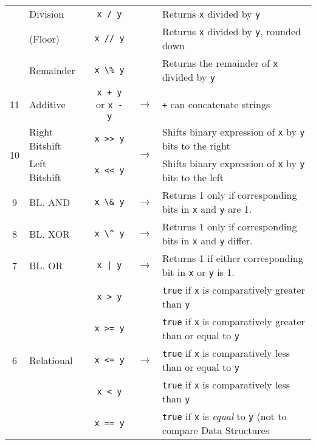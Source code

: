 \documentclass{article}
\begin{document}
\begin{center}
\begin{tabularx}{\textwidth}{clccX}
                      & Division & \lstinline|x / y| & & Returns \lstinline|x| divided by \lstinline|y|\\
                      & (Floor) & \lstinline|x // y| & & Returns \lstinline|x| divided by \lstinline|y|, rounded down\\
                      & Remainder & \lstinline|x \% y| & & Returns the remainder of \lstinline|x| divided by \lstinline|y|\\\midrule
                   11 & Additive & \lstinline|x + y| or \lstinline|x - y| & \(\to\) & \lstinline|+| can concatenate strings\\\midrule
  \multirow{2}{*}{10} & Right Bitshift & \lstinline|x >> y| & \multirow{2}{*}{\(\to\)} & Shifts binary expression of \lstinline|x| by \lstinline|y| bits to the right\\
                      & Left Bitshift & \lstinline|x << y| & & Shifts binary expression of \lstinline|x| by \lstinline|y| bits to the left\\\midrule
                  9 & BL. AND           & \lstinline|x \& y|    & \(\to\) & Returns 1 only if corresponding bits in \lstinline|x| and \lstinline|y| are 1. \\\midrule
                  8 & BL. XOR           & \lstinline|x \^ y|    & \(\to\) & Returns 1 only if corresponding bits in \lstinline|x| and \lstinline|y| differ.\\\midrule
                  7 & BL. OR            & \lstinline+x | y+     & \(\to\) & Returns 1 if either corresponding bit in \lstinline|x| or \lstinline|y| is 1.\\\midrule
  \multirow{10}{*}{6} & \multirow{10}{*}{Relational}        & \lstinline|x > y| & \multirow{10}{*}{\(\to\)} & \lstinline|true| if \lstinline|x| is comparatively greater than \lstinline|y| \\
                    & & \lstinline|x >= y| & & \lstinline|true| if \lstinline|x| is comparatively greater than or equal to \lstinline|y| \\
                    & & \lstinline|x <= y| & & \lstinline|true| if \lstinline|x| is comparatively less than or equal to \lstinline|y| \\
                    & & \lstinline|x < y| & & \lstinline|true| if \lstinline|x| is comparatively less than \lstinline|y| \\
                    & & \lstinline|x == y| & & \lstinline|true| if \lstinline|x| is \textit{equal} to \lstinline|y| (not to compare Data Structures\\

\end{tabularx}
\end{center}
\end{document}
